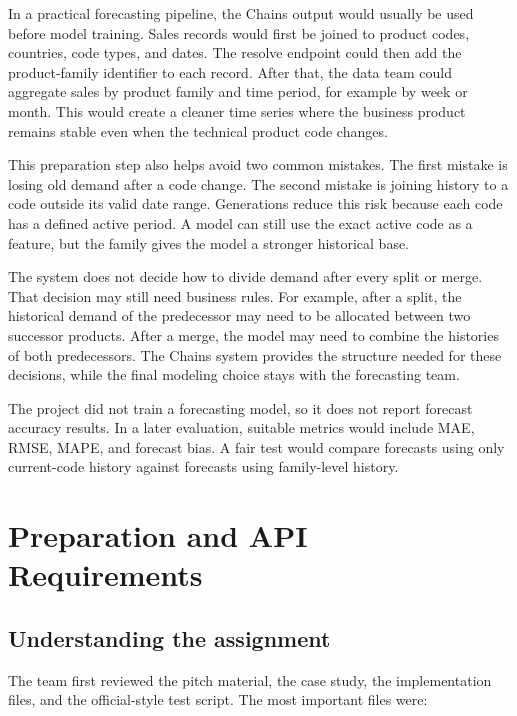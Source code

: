 \documentclass[12pt]{article}
\begin{document}
In a practical forecasting pipeline, the Chains output would usually be used before model training. Sales records would first be joined to product codes, countries, code types, and dates. The resolve endpoint could then add the product-family identifier to each record. After that, the data team could aggregate sales by product family and time period, for example by week or month. This would create a cleaner time series where the business product remains stable even when the technical product code changes.

This preparation step also helps avoid two common mistakes. The first mistake is losing old demand after a code change. The second mistake is joining history to a code outside its valid date range. Generations reduce this risk because each code has a defined active period. A model can still use the exact active code as a feature, but the family gives the model a stronger historical base.

The system does not decide how to divide demand after every split or merge. That decision may still need business rules. For example, after a split, the historical demand of the predecessor may need to be allocated between two successor products. After a merge, the model may need to combine the histories of both predecessors. The Chains system provides the structure needed for these decisions, while the final modeling choice stays with the forecasting team.

The project did not train a forecasting model, so it does not report forecast accuracy results. In a later evaluation, suitable metrics would include MAE, RMSE, MAPE, and forecast bias. A fair test would compare forecasts using only current-code history against forecasts using family-level history.

\section{Preparation and API Requirements}

\subsection{Understanding the assignment}

The team first reviewed the pitch material, the case study, the implementation files, and the official-style test script. The most important files were:
\end{document}
